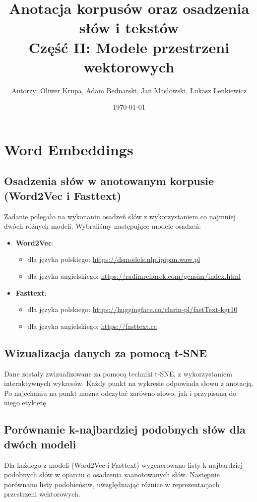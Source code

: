 \documentclass[12pt]{article}
\title{Anotacja korpusów oraz osadzenia słów i tekstów\\Część II: Modele przestrzeni wektorowych}
\author{Autorzy: Oliwer Krupa, Adam Bednarski, Jan Masłowski, Łukasz Lenkiewicz}
\date{\today}
\begin{document}
\maketitle
\newpage

\tableofcontents
\newpage

\section{Word Embeddings}

\subsection{Osadzenia słów w anotowanym korpusie (Word2Vec i Fasttext)}
Zadanie polegało na wykonaniu osadzeń słów z wykorzystaniem co najmniej dwóch różnych modeli. Wybraliśmy następujące modele osadzeń:
\begin{itemize}
    \item \textbf{Word2Vec}:
    \begin{itemize}
        \item dla języka polskiego: \url{https://dsmodels.nlp.ipipan.waw.pl}
        \item dla języka angielskiego: \url{https://radimrehurek.com/gensim/index.html}
    \end{itemize}
    \item \textbf{Fasttext}:
    \begin{itemize}
        \item dla języka polskiego: \url{https://huggingface.co/clarin-pl/fastText-kgr10}
        \item dla języka angielskiego: \url{https://fasttext.cc}
    \end{itemize}
\end{itemize}

\subsection{Wizualizacja danych za pomocą t-SNE}
Dane zostały zwizualizowane za pomocą techniki t-SNE, z wykorzystaniem interaktywnych wykresów. Każdy punkt na wykresie odpowiada słowu z anotacją. Po najechaniu na punkt można odczytać zarówno słowo, jak i przypisaną do niego etykietę.

\subsection{Porównanie k-najbardziej podobnych słów dla dwóch modeli}
Dla każdego z modeli (Word2Vec i Fasttext) wygenerowano listy k-najbardziej podobnych słów w oparciu o osadzenia zaanotowanych słów. Następnie porównano listy podobieństw, uwzględniając różnice w reprezentacjach przestrzeni wektorowych.
\end{document}
